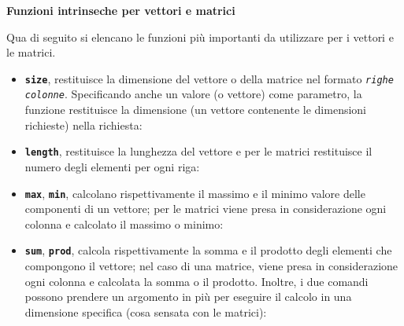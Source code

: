 \newpage

\begin{flushleft}
    \large
    \hypertarget{
        lab: Funzioni intrinseche per vettori e matrici
    }{
        \textcolor{Red3}{\textbf{Funzioni intrinseche per vettori e matrici}}
    }
    \label{lab: Funzioni intrinseche per vettori e matrici}
\end{flushleft}
Qua di seguito si elencano le funzioni più importanti da utilizzare per i vettori e le matrici.
\begin{itemize}
    \item \texttt{\textbf{size}}, restituisce la dimensione del vettore o della matrice nel formato \texttt{\emph{righe} \emph{colonne}}. Specificando anche un valore (o vettore) come parametro, la funzione restituisce la dimensione (un vettore contenente le dimensioni richieste) nella  richiesta:
    

    \item \texttt{\textbf{length}}, restituisce la lunghezza del vettore e per le matrici restituisce il numero degli elementi per ogni riga:
    

    \item \texttt{\textbf{max}}, \texttt{\textbf{min}}, calcolano rispettivamente il massimo e il minimo valore delle componenti di un vettore; per le matrici viene presa in considerazione ogni colonna e calcolato il massimo o minimo:
    

    \item \texttt{\textbf{sum}}, \texttt{\textbf{prod}}, calcola rispettivamente la somma e il prodotto degli elementi che compongono il vettore; nel caso di una matrice, viene presa in considerazione ogni colonna e calcolata la somma o il prodotto. Inoltre, i due comandi possono prendere un argomento in più per eseguire il calcolo in una dimensione specifica (cosa sensata con le matrici):
    


\end{itemize}
